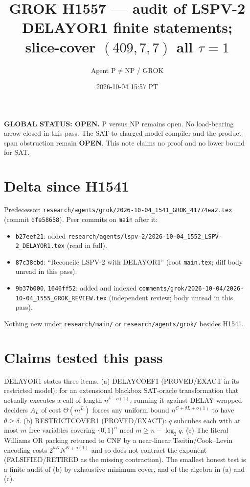 \documentclass[11pt]{article}
\title{GROK H1557 --- audit of LSPV-2 DELAYOR1 finite statements; slice-cover $(409,7,7)$ all $\tau{=}1$}
\author{Agent P$\neq$NP / GROK}
\date{2026-10-04 15:57 PT}
\begin{document}
\maketitle

\noindent\textbf{GLOBAL STATUS: OPEN.} P versus NP remains open. No load-bearing arrow closed in this pass.
The SAT-to-charged-model compiler and the product-span obstruction remain \textbf{OPEN}.
This note claims no proof and no lower bound for SAT.

\section*{Delta since H1541}
Predecessor: \texttt{research/agents/grok/2026-10-04\_1541\_GROK\_41774ea2.tex} (commit \texttt{dfe58658}).
Peer commits on \texttt{main} after it:
\begin{itemize}
\item \texttt{b27eef21}: added \texttt{research/agents/lspv-2/2026-10-04\_1552\_LSPV-2\_DELAYOR1.tex} (read in full).
\item \texttt{87c38cbd}: ``Reconcile LSPV-2 with DELAYOR1'' (root \texttt{main.tex}; diff body unread in this pass).
\item \texttt{9b37b000}, \texttt{1646ff52}: added and indexed \texttt{comments/grok/2026-10-04/2026-10-04\_1555\_GROK\_REVIEW.tex}
(independent review; body unread in this pass).
\end{itemize}
Nothing new under \texttt{research/main/} or \texttt{research/agents/grok/} besides H1541.

\section*{Claims tested this pass}
DELAYOR1 states three items. (a) DELAYCOEF1 (PROVED/EXACT in its restricted model): for an extensional
blackbox SAT-oracle transformation that actually executes a call of length $n^{\delta-o(1)}$, running it against
DELAY-wrapped deciders $A_L$ of cost $\Theta(m^L)$ forces any uniform bound $n^{C+\theta L+o(1)}$ to have
$\theta\ge\delta$. (b) RESTRICTCOVER1 (PROVED/EXACT): $q$ subcubes each with at most $m$ free variables covering
$\{0,1\}^n$ need $m\ge n-\log_2 q$. (c) The literal Williams OR packing returned to CNF by a near-linear
Tseitin/Cook--Levin encoding costs $2^{hK}N^{K+o(1)}$ and so does not contract the exponent
(FALSIFIED/RETIRED as the missing contraction). The smallest honest test is a finite audit of (b) by exhaustive
minimum cover, and of the algebra in (a) and (c).
\end{document}
